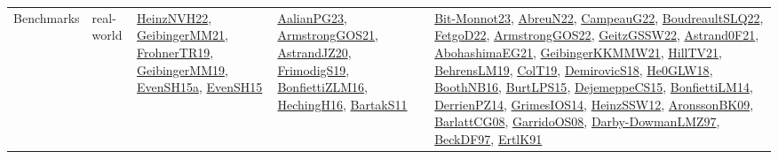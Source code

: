 {\begin{longtable}{lp{3cm}>{\raggedright}p{6cm}>{\raggedright}p{6cm}p{8cm}}
Benchmarks & real-world & \href{articles/HeinzNVH22.pdf}{HeinzNVH22}\cite{HeinzNVH22}, \href{papers/GeibingerMM21.pdf}{GeibingerMM21}\cite{GeibingerMM21}, \href{papers/FrohnerTR19.pdf}{FrohnerTR19}\cite{FrohnerTR19}, \href{papers/GeibingerMM19.pdf}{GeibingerMM19}\cite{GeibingerMM19}, \href{articles/EvenSH15a.pdf}{EvenSH15a}\cite{EvenSH15a}, \href{papers/EvenSH15.pdf}{EvenSH15}\cite{EvenSH15} & \href{papers/AalianPG23.pdf}{AalianPG23}\cite{AalianPG23}, \href{papers/ArmstrongGOS21.pdf}{ArmstrongGOS21}\cite{ArmstrongGOS21}, \href{articles/AstrandJZ20.pdf}{AstrandJZ20}\cite{AstrandJZ20}, \href{papers/FrimodigS19.pdf}{FrimodigS19}\cite{FrimodigS19}, \href{papers/BonfiettiZLM16.pdf}{BonfiettiZLM16}\cite{BonfiettiZLM16}, \href{papers/HechingH16.pdf}{HechingH16}\cite{HechingH16}, \href{articles/BartakS11.pdf}{BartakS11}\cite{BartakS11} & \href{papers/Bit-Monnot23.pdf}{Bit-Monnot23}\cite{Bit-Monnot23}, \href{articles/AbreuN22.pdf}{AbreuN22}\cite{AbreuN22}, \href{articles/CampeauG22.pdf}{CampeauG22}\cite{CampeauG22}, \href{papers/BoudreaultSLQ22.pdf}{BoudreaultSLQ22}\cite{BoudreaultSLQ22}, \href{articles/FetgoD22.pdf}{FetgoD22}\cite{FetgoD22}, \href{papers/ArmstrongGOS22.pdf}{ArmstrongGOS22}\cite{ArmstrongGOS22}, \href{papers/GeitzGSSW22.pdf}{GeitzGSSW22}\cite{GeitzGSSW22}, \href{papers/Astrand0F21.pdf}{Astrand0F21}\cite{Astrand0F21}, \href{articles/AbohashimaEG21.pdf}{AbohashimaEG21}\cite{AbohashimaEG21}, \href{papers/GeibingerKKMMW21.pdf}{GeibingerKKMMW21}\cite{GeibingerKKMMW21}, \href{papers/HillTV21.pdf}{HillTV21}\cite{HillTV21}, \href{papers/BehrensLM19.pdf}{BehrensLM19}\cite{BehrensLM19}, \href{papers/ColT19.pdf}{ColT19}\cite{ColT19}, \href{papers/DemirovicS18.pdf}{DemirovicS18}\cite{DemirovicS18}, \href{papers/He0GLW18.pdf}{He0GLW18}\cite{He0GLW18}, \href{papers/BoothNB16.pdf}{BoothNB16}\cite{BoothNB16}, \href{papers/BurtLPS15.pdf}{BurtLPS15}\cite{BurtLPS15}, \href{papers/DejemeppeCS15.pdf}{DejemeppeCS15}\cite{DejemeppeCS15}, \href{papers/BonfiettiLM14.pdf}{BonfiettiLM14}\cite{BonfiettiLM14}, \href{papers/DerrienPZ14.pdf}{DerrienPZ14}\cite{DerrienPZ14}, \href{articles/GrimesIOS14.pdf}{GrimesIOS14}\cite{GrimesIOS14}, \href{articles/HeinzSSW12.pdf}{HeinzSSW12}\cite{HeinzSSW12}, \href{papers/AronssonBK09.pdf}{AronssonBK09}\cite{AronssonBK09}, \href{papers/BarlattCG08.pdf}{BarlattCG08}\cite{BarlattCG08}, \href{articles/GarridoOS08.pdf}{GarridoOS08}\cite{GarridoOS08}, \href{articles/Darby-DowmanLMZ97.pdf}{Darby-DowmanLMZ97}\cite{Darby-DowmanLMZ97}, \href{papers/BeckDF97.pdf}{BeckDF97}\cite{BeckDF97}, \href{papers/ErtlK91.pdf}{ErtlK91}\cite{ErtlK91}\\

\end{longtable}}
